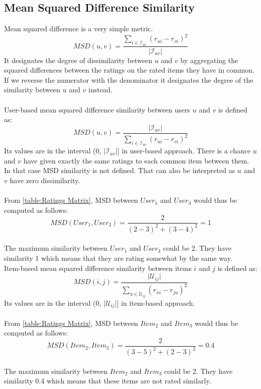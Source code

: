 \subsection{Mean Squared Difference Similarity}
Mean squared difference\citep{shardanand1995social} is a very simple metric.
\begin{equation}\label{eq:msd}
    MSD(u,v) = \frac{\sum_{i \in \mathcal{I}_{uv}}(r_{ui}-r_{vi})^2}
					{\mathopen|\mathcal{I}_{uv}\mathclose|}
\end{equation}
It designates the degree of dissimilarity between $u$ and $v$ by aggregating the squared differences
between the ratings on the rated items they have in common.
If we reverse the numerator with the denominator it designates the degree
of the similarity between $u$ and $v$ instead.\\\\
User-based mean squared difference similarity between users $u$ and $v$ is defined as:
\begin{equation}
    MSD(u,v) = \frac{\mathopen|\mathcal{I}_{uv}\mathclose|}
                    {\sum_{i \in \mathcal{I}_{uv}}(r_{ui}-r_{vi})^2}
\end{equation}
Its values are in the
interval (0, $\mathopen|\mathcal{I}_{uv}\mathclose|$] in user-based approach. There
is a chance $u$ and $v$ have given exactly the same ratings to each common item between them. In that case MSD similarity
is not defined. That can also be interpreted as $u$ and $v$ have zero dissimilarity.\\\\
From \autoref{table:Ratings Matrix}, MSD
between $User_1$ and $User_3$ would thus be computed as follows:
$$MSD(User_1,User_3) = \frac{2}{(2 - 3)^2 + (3 - 4)^2} = 1$$\\
The maximum similarity between $User_1$ and $User_3$ could be 2. They have
similarity 1 which means that they are rating somewhat by the same way.\\
Item-based mean squared difference similarity between items $i$ and $j$ is defined as:
\begin{equation}
        MSD(i,j) = \frac{\mathopen|\mathcal{U}_{ij}\mathclose|}
                        {\sum_{u \in \mathcal{U}_{ij}}(r_{iu}-r_{ju})^2}
\end{equation}
Its values are in the interval (0, $\mathopen|\mathcal{U}_{ij}\mathclose|$] in item-based approach.\\\\
From \autoref{table:Ratings Matrix}, MSD
between $Item_2$ and $Item_3$ would thus be computed as follows:
$$MSD(Item_2,Item_3) = \frac{2}{(3 - 5)^2 + (2 - 3)^2} = 0.4$$\\
The maximum similarity between $Item_2$ and $Item_3$ could be 2. They have
similarity 0.4 which means that these items are not rated similarly.
